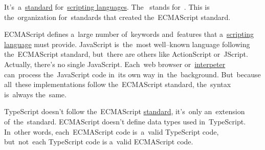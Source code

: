 \label{ecmascript}
It's~a~\hyperref[protocolstandard]{standard} for~\hyperref[scriptinglanguages]{scripting languages}.
The~ stands for~.
This is the~organization for~standards that created the~ECMAScript standard.

ECMAScript defines a~large number of~keywords and~features that a~\hyperref[scriptinglanguages]{scripting language} must provide.
JavaScript is~the~most well--known language following the~ECMAScript standard, but~there are others like ActionScript or~JScript.
Actually, there's no single JavaScript.
Each~web browser or~\hyperref[compiledinterpretedlanguages]{interpeter} can~process the~JavaScript code in~its own way in~the~background.
But~because all~these implementations follow the~ECMAScript standard, the~syntax is~always the~same.

\warning TypeScript doesn't follow the~ECMAScript \hyperref[protocolstandard]{standard}, it's~only an~extension of~the~standard.
ECMAScript doesn't define data types used in~TypeScript.
In~other words, each~ECMAScript code is~a~valid TypeScript code, but~not~each TypeScript code is a~valid ECMAScript code.
